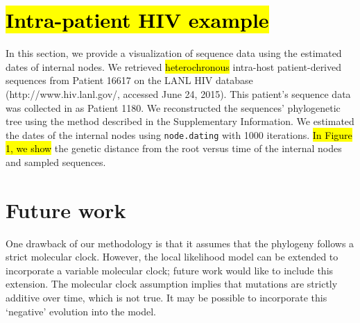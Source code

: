 \documentclass{bioinfo}
\newcommand{\code}[1]{{\tt #1}}
\newcommand{\edit}[1]{\hl{#1}}
\begin{document}
\vspace*{-18pt}

\section{\edit{Intra-patient HIV example}} \label{sec:vis}
In this section, we provide a visualization of sequence data using the estimated dates of internal nodes.
We retrieved \edit{heterochronous} intra-host patient-derived sequences from Patient 16617 on the LANL HIV database (http://www.hiv.lanl.gov/, accessed June 24, 2015).
This patient's sequence data was collected in \cite{Llewellyn06} as Patient 1180.
We reconstructed the sequences' phylogenetic tree using the method described in the Supplementary Information.
We\edit{ }estimated the dates of the internal nodes using \code{node.dating} with 1000 iterations. 
\edit{In Figure 1, we show} the genetic distance from the root versus time of the internal nodes and sampled sequences.

\vspace*{-18pt}

\section{Future work} \label{sec:discuss}
One drawback of our methodology is that it assumes that the phylogeny follows a strict molecular clock.
However, the local likelihood model can be extended to incorporate a variable molecular clock; future work would like to include this extension.
The molecular clock assumption implies that mutations are strictly additive over time, which is not true.
It may be possible to incorporate this `negative' evolution into the model.
\end{document}
